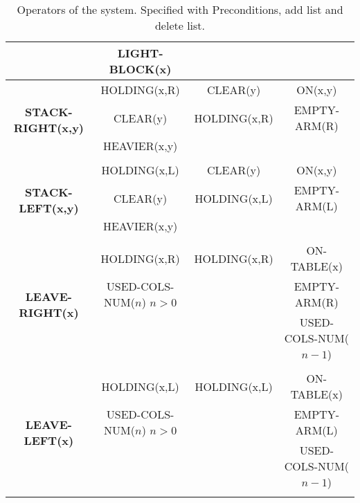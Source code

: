 \begin{table}[H]
\begin{center}
{\begin{tabular}{|c|c|c|c|}
			                                    & LIGHT-BLOCK(x)       &              &                      \\
				\hline
				\multirow{4}{*}{ \textbf{STACK-RIGHT(x,y)} }   & HOLDING(x,R)         & CLEAR(y)     & ON(x,y)              \\
			                                    & CLEAR(y)             & HOLDING(x,R) & EMPTY-ARM(R)         \\
			                                    & HEAVIER(x,y)         &              &                      \\
			                                    &                      &              &                      \\
				\hline
				\multirow{4}{*}{\textbf{ STACK-LEFT(x,y)} }    & HOLDING(x,L)         & CLEAR(y)     & ON(x,y)              \\
			                                    & CLEAR(y)             & HOLDING(x,L) & EMPTY-ARM(L)         \\
			                                    & HEAVIER(x,y)         &              &                      \\
			                                    &                      &              &                      \\
				\hline
				\multirow{4}{*}{ \textbf{LEAVE-RIGHT(x)} }     & HOLDING(x,R)         & HOLDING(x,R) & ON-TABLE(x)          \\
			                                    & USED-COLS-NUM($n$) $n>0$ &              & EMPTY-ARM(R)         \\
			                                    &                      &              & USED-COLS-NUM($n-1$)   \\
			                                    &                      &              &                      \\
				\hline
				\multirow{4}{*}{\textbf{ LEAVE-LEFT(x)} }      & HOLDING(x,L)         & HOLDING(x,L) & ON-TABLE(x)          \\
			                           		       & USED-COLS-NUM($n$) $n>0$ &              & EMPTY-ARM(L)         \\
			    		                           &                      &              & USED-COLS-NUM($n-1$)   \\
			             		                       &                      &              &                      \\
				\hline
			\end{tabular}
			}
	\end{center}
\caption{Operators of the system. Specified with Preconditions, add list and delete list.}
\label{tab:TableOperators}
\end{table}
